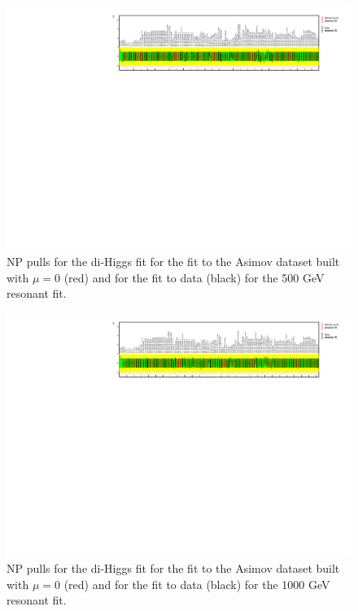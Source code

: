 \begin{figure}
\centering
\includegraphics[angle=270]{figures/results/HH/LepHad/NP_allExceptGammas_2HDM500.pdf}
\caption{NP pulls for the di-Higgs \lephad fit for the fit to the Asimov dataset built with $\mu=0$ (red) and for the fit to data (black) for the 500 GeV  resonant fit.}
\label{fig:LepHadPostfitNPPulls2HDM500}
\end{figure}

\begin{figure}
\centering
\includegraphics[angle=270]{figures/results/HH/LepHad/NP_allExceptGammas_2HDM1000.pdf}
\caption{NP pulls for the di-Higgs \lephad fit for the fit to the Asimov dataset built with $\mu=0$ (red) and for the fit to data (black) for the 1000 GeV resonant fit.}
\label{fig:LepHadPostfitNPPulls2HDM1000}
\end{figure}

